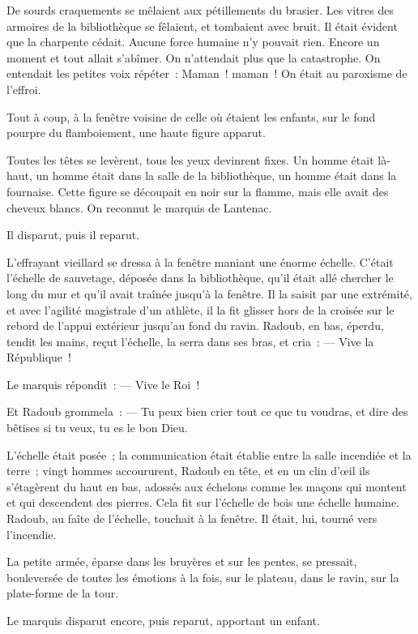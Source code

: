 \documentclass[french,twoside]{book} %
\begin{document}
De sourds craquements se mêlaient aux pétillements du brasier. Les vitres des armoires de la bibliothèque se fêlaient, et tombaient avec bruit. Il était évident que la charpente cédait. Aucune force humaine n’y pouvait rien. Encore un moment et tout allait s’abîmer. On n’attendait plus que la catastrophe. On entendait les petites voix répéter : Maman ! maman ! On était au paroxisme de l’effroi.\par
Tout à coup, à la fenêtre voisine de celle où étaient les enfants, sur le fond pourpre du flamboiement, une haute figure apparut.\par
Toutes les têtes se levèrent, tous les yeux devinrent fixes. Un homme était là-haut, un homme était dans la salle de la bibliothèque, un homme était dans la fournaise. Cette figure se découpait en noir sur la flamme, mais elle avait des cheveux blancs. On reconnut le marquis de Lantenac.\par
Il disparut, puis il reparut.\par
L’effrayant vieillard se dressa à la fenêtre maniant une énorme échelle. C’était l’échelle de sauvetage, déposée dans la bibliothèque, qu’il était allé chercher le long du mur et qu’il avait traînée jusqu’à la fenêtre. Il la saisit par une extrémité, et avec l’agilité  magistrale d’un athlète, il la fit glisser hors de la croisée sur le rebord de l’appui extérieur jusqu’au fond du ravin. Radoub, en bas, éperdu, tendit les mains, reçut l’échelle, la serra dans ses bras, et cria : — Vive la République !\par
Le marquis répondit : — Vive le Roi !\par
Et Radoub grommela : — Tu peux bien crier tout ce que tu voudras, et dire des bêtises si tu veux, tu es le bon Dieu.\par
L’échelle était posée ; la communication était établie entre la salle incendiée et la terre ; vingt hommes accoururent, Radoub en tête, et en un clin d’œil ils s’étagèrent du haut en bas, adossés aux échelons comme les maçons qui montent et qui descendent des pierres. Cela fit sur l’échelle de bois une échelle humaine. Radoub, au faîte de l’échelle, touchait à la fenêtre. Il était, lui, tourné vers l’incendie.\par
La petite armée, éparse dans les bruyères et sur les pentes, se pressait, bouleversée de toutes les émotions à la fois, sur le plateau, dans le ravin, sur la plate-forme de la tour.\par
Le marquis disparut encore, puis reparut, apportant un enfant.\par
\end{document}
